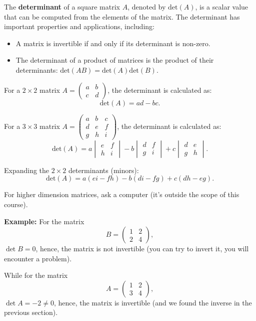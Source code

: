 \documentclass[]{article}
\begin{document}
	The \textbf{determinant} of a square matrix $A$, denoted by $\text{det}(A)$, is a scalar value that can be computed from the elements of the matrix. The determinant has important properties and applications, including:
	\begin{itemize}
		\item A matrix is invertible if and only if its determinant is non-zero.
		\item The determinant of a product of matrices is the product of their determinants: $\text{det}(AB) = \text{det}(A)\text{det}(B)$.
	\end{itemize}
	
	For a $2 \times 2$ matrix $A = \begin{pmatrix} a & b \\ c & d \end{pmatrix}$, the determinant is calculated as:
	$$
	\text{det}(A) = ad - bc.
	$$
	
	For a $3 \times 3$ matrix $A = \begin{pmatrix} a & b & c \\ d & e & f \\ g & h & i \end{pmatrix} $, the determinant is calculated as:
	$$
	\text{det}(A) =
	  a \begin{vmatrix} e & f \\ h & i \end{vmatrix}
	- b \begin{vmatrix} d & f \\ g & i \end{vmatrix}
	+ c \begin{vmatrix} d & e \\ g & h \end{vmatrix}.
	$$
	
	Expanding the $2 \times 2$ determinants (minors):
	$$
	\text{det}(A) = a(ei - fh) - b(di - fg) + c(dh - eg).
	$$
	
	For higher dimension matrices, ask a computer (it's outside the scope of this course).
	
	\noindent \textbf{Example:} For the matrix
	$$
	B = \begin{pmatrix} 1 & 2 \\ 2 & 4 \end{pmatrix},
	$$
	$\det{B} = 0$, hence, the matrix is not invertible (you can try to invert it, you will encounter a problem).
	
	While for the matrix
	$$
	A = \begin{pmatrix} 1 & 2 \\ 3 & 4 \end{pmatrix},
	$$
	$\det{A} = -2 \neq 0$, hence, the matrix is invertible (and we found the inverse in the previous section).
\end{document}
